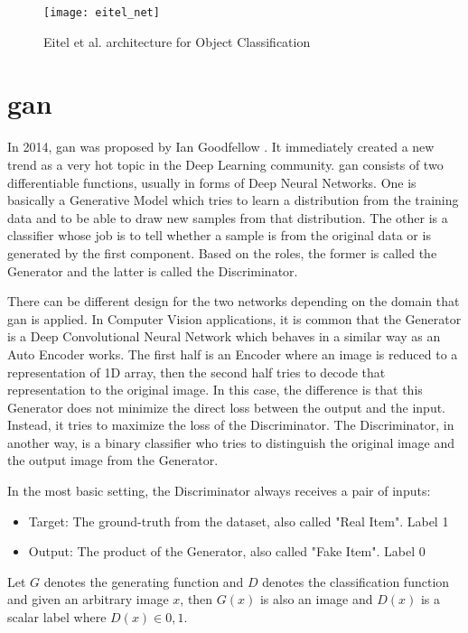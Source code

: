 \begin{figure}[htb]
  \centering
  \texttt{[image: eitel\_net]}
  \caption{Eitel et al. architecture for Object Classification}\label{fig:eitel_net}
\end{figure}

\section{\acrfull{gan}}
In 2014, {\acrlong{gan}} was proposed by Ian Goodfellow \cite{gan}. It immediately
created a new trend as a very hot topic in the Deep Learning community. \acrshort{gan}
consists of two differentiable functions, usually in forms of Deep Neural Networks. One is
basically a Generative Model which tries to learn a distribution from the training data
and to be able to draw new samples from that distribution. The other is a classifier whose
job is to tell whether a sample is from the original data or is generated by the first
component. Based on the roles, the former is called the Generator and the latter is called
the Discriminator.

There can be different design for the two networks depending on the domain that
\acrshort{gan} is applied. In Computer Vision applications, it is common that the
Generator is a Deep Convolutional Neural Network which behaves in a similar way as an Auto
Encoder \cite{auto_encoder} works. The first half is an Encoder where an image is
reduced to a representation of 1D array, then the second half tries to decode that
representation to the original image. In this case, the difference is that this Generator
does not minimize the direct loss between the output and the input. Instead, it tries to
maximize the loss of the Discriminator. The Discriminator, in another way, is a binary
classifier who tries to distinguish the original image and the output image from the
Generator. 

In the most basic setting, the Discriminator always receives a pair of inputs:

\begin{itemize}
	\item Target: The ground-truth from the dataset, also called "Real Item". Label 1
	\item Output: The product of the Generator, also called "Fake Item". Label 0
\end{itemize}

Let $G$ denotes the generating function and $D$ denotes the classification function and
given an arbitrary image $x$, then $G(x)$ is also an image and $D(x)$ is a scalar label where
$D(x) \in {0, 1}$.


